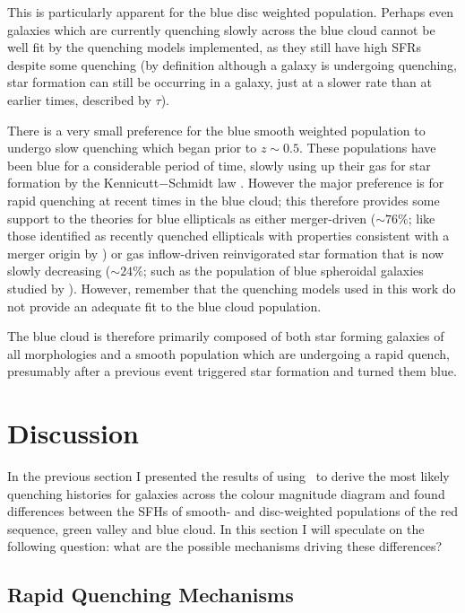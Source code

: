 This is particularly apparent for the blue disc weighted population. Perhaps even galaxies which are currently quenching slowly across the blue cloud cannot be well fit by the quenching models implemented, as they still have high SFRs despite some quenching (by definition although a galaxy is undergoing quenching, star formation can still be occurring in a galaxy, just at a slower rate than at earlier times, described by $\tau$).


There is a very small preference for the blue smooth weighted population to undergo slow quenching which began prior to $z \sim 0.5 $. These populations have been blue for a considerable period of time, slowly using up their gas for star formation by the Kennicutt$-$Schmidt law \citep{Schmidt59, Kennicutt97}. However the major preference is for rapid quenching at recent times in the blue cloud; this therefore provides some support to the theories for blue ellipticals as either merger-driven ($\sim76\%$; like those identified as recently quenched ellipticals with properties consistent with a merger origin by \citealt{McIntosh14}) or gas inflow-driven reinvigorated star formation that is now slowly decreasing ($\sim24\%$; such as the population of blue spheroidal galaxies studied by \citealt{Kaviraj13}). However, remember that the quenching models used in this work do not provide an adequate fit to the blue cloud population.

The blue cloud is therefore primarily composed of both star forming galaxies of all morphologies and a smooth population which are undergoing a rapid quench, presumably after a previous event triggered star formation and turned them blue.


\section{Discussion}\label{morph:discussion}

In the previous section I presented the results of using \starpy ~to derive the most likely quenching histories for galaxies across the colour magnitude diagram and found differences between the SFHs of smooth- and disc-weighted populations of the red sequence, green valley and blue cloud. In this section I will speculate on the following question: what are the possible mechanisms driving these differences? 

\subsection{Rapid Quenching Mechanisms}\label{rapid}

